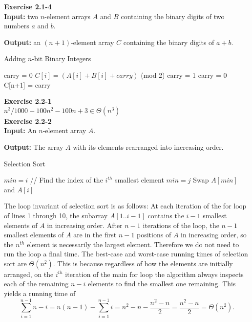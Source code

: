 \documentclass{article}
\begin{document}
\noindent\textbf{ Exercise 2.1-4} \\

\textbf{Input:} two $n$-element arrays $A$ and $B$ containing the binary digits of two numbers $a$ and $b$.  

\textbf{Output:} an $(n+1)$-element array $C$ containing the binary digits of $a+b$.
\begin{algorithm}
\caption{Adding $n$-bit Binary Integers}
\begin{algorithmic}[1]
\State carry = 0
	\State $C[i] = (A[i] + B[i] + carry)$ (mod 2)
		\State carry = 1
	\Else
	\State carry = 0
	\EndIf
\EndFor
\State C[n+1] = carry
\end{algorithmic}
\end{algorithm}

\noindent\textbf{ Exercise 2.2-1}\\

$n^3/1000 - 100n^2-100n +3 \in \Theta(n^3)$ \\

\noindent\textbf{ Exercise 2.2-2}\\

\textbf{Input:} An $n$-element array $A$.

\textbf{Output:} The array $A$ with its elements rearranged into increasing order.

\begin{algorithm}
\caption{Selection Sort}
\begin{algorithmic}[1]
	\State $min = i$
	\State // Find the index of the $i^{th}$ smallest element
			\State $min = j$
		\EndIf
	\EndFor
	\State Swap $A[min]$ and $A[i]$
\EndFor
\end{algorithmic}
\end{algorithm}

The loop invariant of selection sort is as follows:  At each iteration of the for loop of lines 1 through 10, the subarray $A[1..i-1]$ contains the $i-1$ smallest elements of $A$ in increasing order.  After $n-1$ iterations of the loop, the $n-1$ smallest elements of $A$ are in the first $n-1$ positions of $A$ in increasing order, so the $n^{th}$ element is necessarily the largest element.  Therefore we do not need to run the loop a final time.  The best-case and worst-case running times of selection sort are $\Theta(n^2)$.  This is because regardless of how the elements are initially arranged, on the $i^{th}$ iteration of the main for loop the algorithm always inspects each of the remaining $n-i$ elements to find the smallest one remaining.  This yields a running time of 
\[ \sum_{i=1}^{n-1} n-i = n(n-1) - \sum_{i=1}^{n-1} i = n^2 - n - \frac{n^2 - n}{2} = \frac{n^2 - n}{2} = \Theta(n^2).\]
\end{document}
